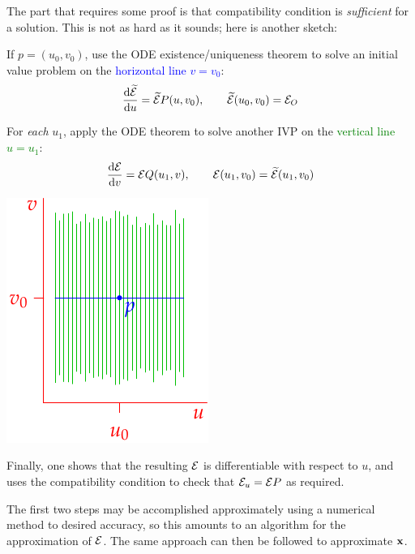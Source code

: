 \goodbreak

The part that requires some proof is that compatibility condition is \emph{sufficient} for a solution. This is not as hard as it sounds; here is another sketch:
\begin{enumerate}
  \begin{minipage}[t]{0.7\linewidth}\vspace{0pt}
  \item If $p=(u_0,v_0)$, use the ODE existence/uniqueness theorem to solve an initial value problem on the \textcolor{blue}{horizontal line $v=v_0$}:
  \[
  \diff[\widetilde\cE]{u}=\widetilde\cE P(u,v_0),\qquad \widetilde\cE(u_0,v_0)=\cE_O
	\]
  
  \item For \emph{each} $u_1$, apply the ODE theorem to solve another IVP on the \textcolor{Green}{vertical line $u=u_1$}:
  \[\diff[\cE]{v}=\cE Q(u_1,v),\qquad \cE(u_1,v_0)=\widetilde\cE(u_1,v_0)
	\]
  \end{minipage}\hfill\begin{minipage}[t]{0.29\linewidth}\vspace{0pt}
  	\flushright\includegraphics{adaptive-frobenius}
  \end{minipage}
  \item Finally, one shows that the resulting $\cE$ is differentiable with respect to $u$, and uses the compatibility condition to check that $\cE_u=\cE P$ as required.
\end{enumerate}
The first two steps may be accomplished approximately using a numerical method to desired accuracy, so this amounts to an algorithm for the approximation of $\cE$. The same approach can then be followed to approximate $\vx$.

